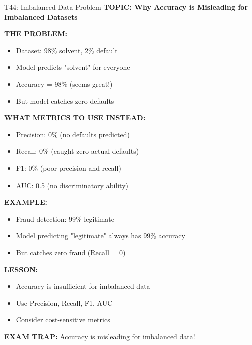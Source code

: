 \documentclass[8pt]{beamer}
\begin{document}
	\begin{frame}{T44: Imbalanced Data Problem}
		\fontsize{6.5}{7.5}\selectfont
		\textbf{TOPIC: Why Accuracy is Misleading for Imbalanced Datasets}
		
		\vspace{0.1cm}
		\textbf{THE PROBLEM:}
		\begin{itemize}
			\item Dataset: 98\% solvent, 2\% default
			\item Model predicts "solvent" for everyone
			\item Accuracy = 98\% (seems great!)
			\item But model catches zero defaults
		\end{itemize}
		
		\vspace{0.1cm}
		\textbf{WHAT METRICS TO USE INSTEAD:}
		\begin{itemize}
			\item \textcolor{myblue}{Precision:} 0\% (no defaults predicted)
			\item \textcolor{myblue}{Recall:} 0\% (caught zero actual defaults)
			\item \textcolor{myblue}{F1:} 0\% (poor precision and recall)
			\item \textcolor{myblue}{AUC:} 0.5 (no discriminatory ability)
		\end{itemize}
		
		\vspace{0.1cm}
		\textbf{EXAMPLE:}
		\begin{itemize}
			\item Fraud detection: 99\% legitimate
			\item Model predicting "legitimate" always has 99\% accuracy
			\item But catches zero fraud (Recall = 0)
		\end{itemize}
		
		\vspace{0.1cm}
		\textbf{LESSON:}
		\begin{itemize}
			\item Accuracy is insufficient for imbalanced data
			\item Use Precision, Recall, F1, AUC
			\item Consider cost-sensitive metrics
		\end{itemize}
		
		\textcolor{myred}{\textbf{EXAM TRAP:}} Accuracy is \textcolor{myblue}{misleading for imbalanced data}!
	\end{frame}
	
\end{document}
